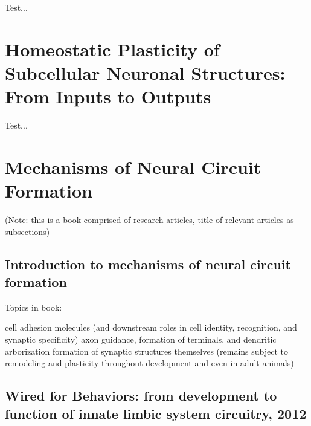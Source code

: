 \documentclass[11pt, a4paper, oneside]{article}   	%
\begin{document}
Test...

\section{Homeostatic Plasticity of Subcellular Neuronal Structures: From Inputs to Outputs \cite{Wefelmeyer2016}}

Test...

\section{Mechanisms of Neural Circuit Formation \cite{Weiner2015}}
(Note: this is a book comprised of research articles, title of relevant articles as subsections)


\subsection{Introduction to mechanisms of neural circuit formation}
Topics in book:
\begin{outline}
\point cell adhesion molecules (and downstream roles in cell identity, recognition, and synaptic specificity)
\point axon guidance, formation of terminals, and dendritic arborization
\point formation of synaptic structures themselves (remains subject to remodeling and plasticity throughout development and even in adult animals)
\end{outline}

\subsection{Wired for Behaviors: from development to function of innate limbic system circuitry, 2012}
\label{MNCF:wiredforbehaviors}
\end{document}
